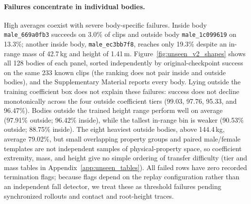 \paragraph{Failures concentrate in individual bodies.}
High averages coexist with severe body-specific failures. Inside body
\texttt{male\_669a0fb3} succeeds on 3.0\% of clips and outside body
\texttt{male\_1c099619} on 13.3\%; another inside body, \texttt{male\_ec3bb7f8},
reaches only 19.3\% despite an in-range mass of 42.7\,kg and height of 1.41\,m.
Figure~\ref{fig:unseen_v2_shapes} shows all 128 bodies of each panel, sorted
independently by original-checkpoint success on the same 233 known clips (the
ranking does not pair inside and outside bodies), and
the Supplementary Material reports every body. Lying outside the training
coefficient box does not explain these failures: success does not decline
monotonically across the four outside coefficient tiers (99.03, 97.76, 95.33,
and 96.47\%). Bodies outside the trained height range perform well on average
(97.91\% outside; 96.42\% inside), while the tallest in-range bin is weaker
(90.53\% outside; 88.75\% inside). The eight heaviest outside bodies, above
144.4\,kg, average 79.02\%, but small overlapping property groups and paired
male/female templates are not independent samples of physical-property space, so
coefficient extremity, mass, and height give no simple ordering of transfer
difficulty (tier and mass tables in Appendix~\ref{app:unseen_tables}). All failed
rows have zero recorded termination flags; because flags depend on the replay
configuration rather than an independent fall detector, we treat these as
threshold failures pending synchronized rollouts and contact and root-height
traces.

